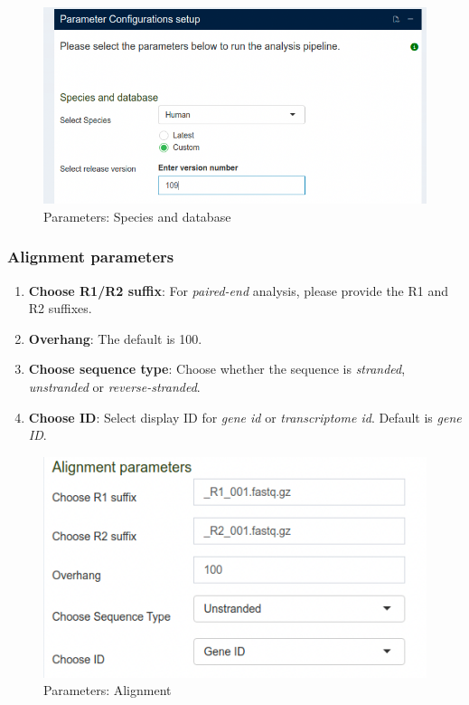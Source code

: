 \documentclass[
  a4paper,
  oneside,
  open=any]{scrreport}
\providecommand{\tightlist}{%
  \setlength{\itemsep}{0pt}\setlength{\parskip}{0pt}}\usepackage{longtable,booktabs,array}
\begin{document}
\begin{figure}[H]

{\centering \includegraphics{./_images/transcriptome/transcript5.png}

}

\caption{\label{fig-trans4}Parameters: Species and database}

\end{figure}

\hypertarget{alignment-parameters}{%
\subsubsection{Alignment parameters}\label{alignment-parameters}}

\begin{enumerate}
\def\labelenumi{\arabic{enumi}.}
\tightlist
\item
  \textbf{Choose R1/R2 suffix}: For \emph{paired-end} analysis, please
  provide the R1 and R2 suffixes.
\item
  \textbf{Overhang}: The default is 100.
\item
  \textbf{Choose sequence type}: Choose whether the sequence is
  \emph{stranded}, \emph{unstranded} or \emph{reverse-stranded}.
\item
  \textbf{Choose ID}: Select display ID for \emph{gene id} or
  \emph{transcriptome id}. Default is \emph{gene ID}.
\end{enumerate}

\begin{figure}[H]

{\centering \includegraphics{./_images/transcriptome/transcript6.png}

}

\caption{\label{fig-trans5}Parameters: Alignment}

\end{figure}
\end{document}
